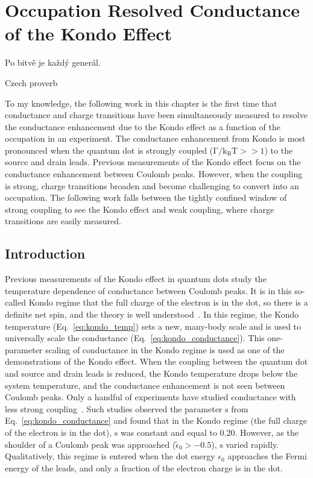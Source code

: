 \chapter[Occupation Resolved Conductance of the Kondo Effect]{Occupation Resolved Conductance of the Kondo Effect}\label{cha:mixed_valence_conductance}

\epigraph{Po bitvě je každý generál.}{Czech proverb}%

\noindent To my knowledge, the following work in this chapter is the first time that conductance and charge transitions have been simultaneously measured to resolve the conductance enhancement due to the Kondo effect as a function of the occupation in an experiment. The conductance enhancement from Kondo is most pronounced when the quantum dot is strongly coupled ($\mathrm{\Gamma/k_BT}>>1$) to the source and drain leads. Previous measurements of the Kondo effect focus on the conductance enhancement between Coulomb peaks. However, when the coupling is strong, charge transitions broaden and become challenging to convert into an occupation. The following work falls between the tightly confined window of strong coupling to see the Kondo effect and weak coupling, where charge transitions are easily measured. 

\section{Introduction}
Previous measurements of the Kondo effect in quantum dots study the temperature dependence of conductance between Coulomb peaks. It is in this so-called Kondo regime that the full charge of the electron is in the dot, so there is a definite net spin, and the theory is well understood~\cite{costi_kondo_mv_eo_regime, kondo_unitary}. In this regime, the Kondo temperature (Eq.~\ref{eq:kondo_temp}) sets a new, many-body scale and is used to universally scale the conductance (Eq.~\ref{eq:kondo_conductance}). This one-parameter scaling of conductance in the Kondo regime is used as one of the demonstrations of the Kondo effect. When the coupling between the quantum dot and source and drain leads is reduced, the Kondo temperature drops below the system temperature, and the conductance enhancement is not seen between Coulomb peaks. Only a handful of experiments have studied conductance with less strong coupling~\cite{goldhaber_mv}. Such studies observed the parameter $\mathrm{s}$ from Eq.~\ref{eq:kondo_conductance} and found that in the Kondo regime (the full charge of the electron is in the dot), $\mathrm{s}$ was constant and equal to $0.20$. However, as the shoulder of a Coulomb peak was approached ($\tilde{\epsilon}_0>-0.5$), $\mathrm{s}$ varied rapidly. Qualitatively, this regime is entered when the dot energy $\epsilon_0$ approaches the Fermi energy of the leads, and only a fraction of the electron charge is in the dot. 


